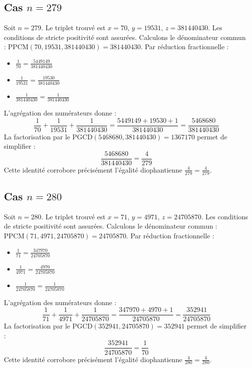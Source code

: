 \documentclass[11pt,a4paper]{article}
\begin{document}
\subsection{Cas $n = 279$}
Soit $n = 279$. Le triplet trouvé est $x = 70$, $y = 19531$, $z = 381440430$.
Les conditions de stricte positivité sont assurées.
Calculons le dénominateur commun : $\text{PPCM}(70, 19531, 381440430) = 381440430$.
Par réduction fractionnelle :
\begin{itemize}
    \item $\frac{1}{70} = \frac{5449149}{381440430}$
    \item $\frac{1}{19531} = \frac{19530}{381440430}$
    \item $\frac{1}{381440430} = \frac{1}{381440430}$
\end{itemize}
L'agrégation des numérateurs donne :
$$ \frac{1}{70} + \frac{1}{19531} + \frac{1}{381440430} = \frac{5449149 + 19530 + 1}{381440430} = \frac{5468680}{381440430} $$
La factorisation par le $\text{PGCD}(5468680, 381440430) = 1367170$ permet de simplifier :
$$ \frac{5468680}{381440430} = \frac{4}{279} $$
Cette identité corrobore précisément l'égalité diophantienne $\frac{4}{279} = \frac{4}{279}$.

\subsection{Cas $n = 280$}
Soit $n = 280$. Le triplet trouvé est $x = 71$, $y = 4971$, $z = 24705870$.
Les conditions de stricte positivité sont assurées.
Calculons le dénominateur commun : $\text{PPCM}(71, 4971, 24705870) = 24705870$.
Par réduction fractionnelle :
\begin{itemize}
    \item $\frac{1}{71} = \frac{347970}{24705870}$
    \item $\frac{1}{4971} = \frac{4970}{24705870}$
    \item $\frac{1}{24705870} = \frac{1}{24705870}$
\end{itemize}
L'agrégation des numérateurs donne :
$$ \frac{1}{71} + \frac{1}{4971} + \frac{1}{24705870} = \frac{347970 + 4970 + 1}{24705870} = \frac{352941}{24705870} $$
La factorisation par le $\text{PGCD}(352941, 24705870) = 352941$ permet de simplifier :
$$ \frac{352941}{24705870} = \frac{1}{70} $$
Cette identité corrobore précisément l'égalité diophantienne $\frac{4}{280} = \frac{4}{280}$.
\end{document}
